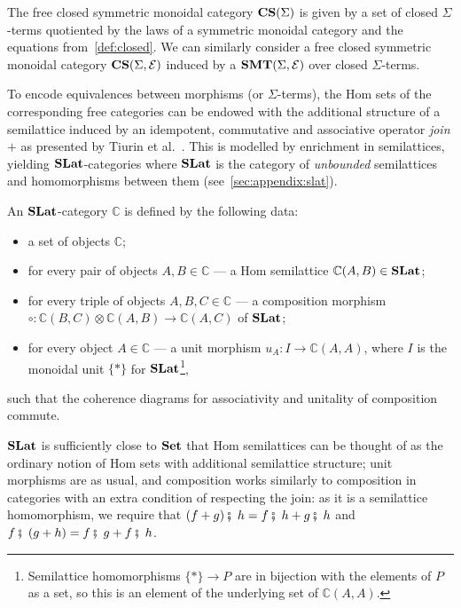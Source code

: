 \begin{definition}
	The free closed symmetric monoidal category $\mathbf{CS}(\Sigma)$ is given by a set of closed $\Sigma$-terms quotiented by the laws of a symmetric monoidal category and the equations from~\autoref{def:closed}.
	We can similarly consider a free closed symmetric monoidal category $\mathbf{CS}(\Sigma, \mathcal{E})$ induced by a $\mathbf{SMT}(\Sigma, \mathcal{E})$ over closed $\Sigma$-terms.
\end{definition}

To encode equivalences between morphisms (or $\Sigma$-terms), the Hom sets of the corresponding free categories can be endowed with the additional structure of a semilattice induced by an idempotent, commutative and associative operator \textit{join} $+$ as presented by Tiurin et al.~\cite{tiurin2025equivalencehypergraphsdporewriting}.
This is modelled by enrichment in semilattices, yielding $\mathbf{SLat}$-categories where $\mathbf{SLat}$ is the category of \textit{unbounded} semilattices and homomorphisms between them (see~\autoref{sec:appendix:slat}).

\begin{definition}%
	\label{def:slat-cat}
	An $\mathbf{SLat}$-category $\mathbb{C}$ is defined by the following data:
	\begin{itemize}
		\item a set of objects $\mathbb{C}$;
		\item for every pair of objects $A,B \in \mathbb{C}$ --- a Hom semilattice $\mathbb{C}(A,B) \in \mathbf{SLat}$;
		\item for every triple of objects $A,B,C \in \mathbb{C}$ --- a composition morphism
		      $\circ\colon \mathbb{C}(B,C) \otimes \mathbb{C}(A,B) \to \mathbb{C}(A,C)$ of $\mathbf{SLat}$;
		\item for every object $A \in \mathbb{C}$ --- a unit morphism
		      $u_{A}\colon I \to \mathbb{C}(A,A)$, where $I$ is the monoidal unit $\{*\}$ for $\mathbf{SLat}$\footnote{Semilattice homomorphisms $\{*\} \to P$ are in bijection with the elements of $P$ as a set, so this is an element of the underlying set of $\mathbb{C}(A,A)$.},
	\end{itemize}
   such that the coherence diagrams for associativity and unitality of composition commute.
\end{definition}
$\mathbf{SLat}$ is sufficiently close to $\mathbf{Set}$ that Hom semilattices can be thought of as the ordinary notion of Hom sets with additional semilattice structure; unit morphisms are as usual, and composition works similarly to composition in categories with an extra condition of respecting the join: as it is a semilattice homomorphism, we require that $(f + g)\fatsemi\; h = f\fatsemi\;h + g\fatsemi\;h$ and $f\fatsemi\;(g+h) = f\fatsemi\;g + f\fatsemi\;h$.

